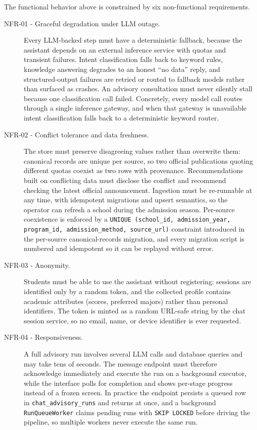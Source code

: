 \documentclass[../main.tex]{subfiles}
\begin{document}
The functional behavior above is constrained by six non-functional requirements.

\begin{description}
    \item[NFR-01 - Graceful degradation under \gls{LLM} outage.]
    Every \gls{LLM}-backed step must have a deterministic fallback, because the assistant depends on an external inference service with quotas and transient failures.
    Intent classification falls back to keyword rules, knowledge answering degrades to an honest ``no data'' reply, and structured-output failures are retried or routed to fallback models rather than surfaced as crashes.
    An advisory consultation must never silently stall because one classification call failed.
    Concretely, every model call routes through a single inference gateway, and when that gateway is unavailable intent classification falls back to a deterministic keyword router.

    \item[NFR-02 - Conflict tolerance and data freshness.]
    The store must preserve disagreeing values rather than overwrite them: canonical records are unique per source, so two official publications quoting different quotas coexist as two rows with provenance.
    Recommendations built on conflicting data must disclose the conflict and recommend checking the latest official announcement.
    Ingestion must be re-runnable at any time, with idempotent migrations and upsert semantics, so the operator can refresh a school during the admission season.
    Per-source coexistence is enforced by a \texttt{UNIQUE (school\_id, admission\_year, program\_id, admission\_method, source\_url)} constraint introduced in the per-source canonical-records migration, and every migration script is numbered and idempotent so it can be replayed without error.

    \item[NFR-03 - Anonymity.]
    Students must be able to use the assistant without registering: sessions are identified only by a random token, and the collected profile contains academic attributes (scores, preferred majors) rather than personal identifiers.
    The token is minted as a random URL-safe string by the chat session service, so no email, name, or device identifier is ever requested.

    \item[NFR-04 - Responsiveness.]
    A full advisory run involves several \gls{LLM} calls and database queries and may take tens of seconds.
    The message endpoint must therefore acknowledge immediately and execute the run on a background executor, while the interface polls for completion and shows per-stage progress instead of a frozen screen.
    In practice the endpoint persists a queued row in \texttt{chat\_advisory\_runs} and returns at once, and a background \texttt{RunQueueWorker} claims pending runs with \texttt{SKIP LOCKED} before driving the pipeline, so multiple workers never execute the same run.


\end{description}
\end{document}
